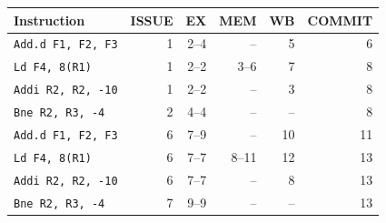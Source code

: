 \begin{tabular}{@{}lrrrrr@{}}\toprule
Instruction & ISSUE & EX & MEM & WB & COMMIT\\\midrule
\texttt{Add.d F1, F2, F3} & 1 & 2--4 & -- & 5 & 6 \\
\texttt{Ld F4, 8(R1)} & 1 & 2--2 & 3--6 & 7 & 8 \\
\texttt{Addi R2, R2, -10} & 1 & 2--2 & -- & 3 & 8 \\
\texttt{Bne R2, R3, -4} & 2 & 4--4 & -- & -- & 8 \\
\texttt{Add.d F1, F2, F3} & 6 & 7--9 & -- & 10 & 11 \\
\texttt{Ld F4, 8(R1)} & 6 & 7--7 & 8--11 & 12 & 13 \\
\texttt{Addi R2, R2, -10} & 6 & 7--7 & -- & 8 & 13 \\
\texttt{Bne R2, R3, -4} & 7 & 9--9 & -- & -- & 13 \\
\bottomrule\end{tabular}